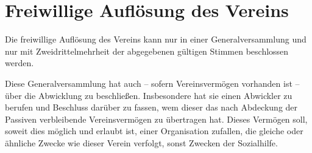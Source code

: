 \documentclass{article}
\begin{document}
\section{Freiwillige Auflösung des Vereins}
\begin{absatz}
    \item Die freiwillige Auflösung des Vereins kann nur in einer Generalversammlung und nur mit Zweidrittelmehrheit der abgegebenen gültigen Stimmen beschlossen werden.
    \item Diese Generalversammlung hat auch – sofern Vereinsvermögen vorhanden ist – über die Abwicklung zu beschließen. Insbesondere hat sie einen Abwickler zu berufen und Beschluss darüber zu fassen, wem dieser das nach Abdeckung der Passiven verbleibende Vereinsvermögen zu übertragen hat. Dieses Vermögen
    soll, soweit dies möglich und erlaubt ist, einer Organisation zufallen, die gleiche oder ähnliche Zwecke wie dieser Verein verfolgt, sonst Zwecken der Sozialhilfe.
\end{absatz}
\end{document}
